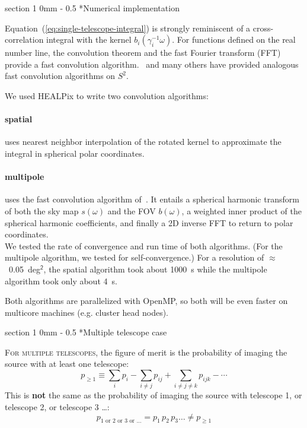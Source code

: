 \documentclass[portrait]{a0poster}
\makeatletter
\renewcommand{\section}{\@startsection
{section}%
{1}%
{0mm}%
{-\baselineskip}%
{0.5\baselineskip}%
{\fontspec{Marvel Bold}\Huge}} %
\makeatother
\begin{document}
\section*{Numerical implementation}

Equation~(\ref{eq:single-telescope-integral}) is strongly reminiscent of a cross-correlation integral with the kernel $b_i (\gamma_i^{-1} \omega)$.  For functions defined on the real number line, the convolution theorem and the fast Fourier transform (FFT) provide a fast convolution algorithm.  \citet{Wandelt:2001p13439}~and many others have provided analogous fast convolution algorithms on $S^2$.

We used HEALPix to write two convolution algorithms:

\paragraph{spatial} uses nearest neighbor interpolation of the rotated kernel to approximate the integral in spherical polar coordinates.

\paragraph{multipole} uses the fast convolution algorithm of~\citet{Wandelt:2001p13439}.  It entails a spherical harmonic transform of both the sky map $s(\omega)$ and the FOV $b(\omega)$, a weighted inner product of the spherical harmonic coefficients, and finally a 2D inverse FFT to return to polar coordinates.\\

We tested the rate of convergence and run time of both algorithms.  (For the multipole algorithm, we tested for self-convergence.)  For a resolution of $\approx$~0.05~deg$^\mathsf{2}$, the spatial algorithm took about 1000~s while the multipole algorithm took only about 4~s.

Both algorithms are parallelized with OpenMP, so both will be even faster on multicore machines (e.g. cluster head nodes).

\section*{Multiple telescope case}

\lettrine{F}{or multiple telescopes}, the figure of merit is the probability of imaging the source with at least one telescope:
$$
	p_{\geqslant 1} \equiv \sum_i p_i - \sum_{i \neq j} p_{ij} + \sum_{i \neq j \neq k} p_{ijk} - \cdots
$$
This is \textbf{not} the same as the probability of imaging the source with telescope 1, or telescope 2, or telescope 3 \dots :
$$
	p_{1 \textrm{ or } 2 \textrm{ or } 3 \textrm{ or } \dots} = p_1 \, p_2 \, p_3 \dots \neq p_{\geqslant 1}
$$



\end{document}
